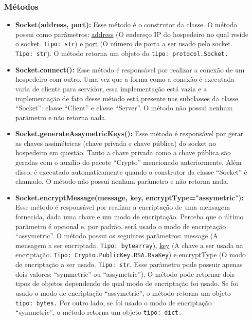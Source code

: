 \documentclass[10pt]{article}
\begin{document}
\begin{itemize}
        \subsubsection{\large Métodos}
            \begin{itemize}
            \item \textbf{Socket(address, port):} Esse método é o construtor da classe. O método possui como parâmetros: \underline{address} (O endereço IP do hospedeiro no qual reside o socket. \texttt{Tipo: str}) e \underline{port} (O número de porta a ser usado pelo socket. \texttt{Tipo: str}). O método retorna um objeto do \texttt{tipo: protocol.Socket.}
            \item \textbf{Socket.connect():} Esse método é responsável por realizar a conexão de um hospedeiro
            com outro. Uma vez que a forma como a conexão é executada varia de cliente para servidor, essa implementação está vazia e a implementação de fato desse método está presente nas subclasses da classe “Socket”: classe “Client” e classe “Server”. O método não possui nenhum parâmetro e não retorna nada.
            \item \textbf{Socket.generateAssymetricKeys():} Esse método é responsável por gerar as chaves assimétricas (chave privada e chave pública) do socket no hospedeiro em questão. Tanto a chave privada como a chave pública são geradas com o auxílio do pacote “Crypto” mencionado anteriormente. Além disso, é executado automaticamente quando o construtor da classe “Socket” é chamado. O método não possui nenhum parâmetro e não retorna nada.
            \item \textbf{Socket.encryptMessage(message, key, encryptType="assymetric"):} Esse \newline método é responsável por realizar a encriptação de uma mensagem fornecida, dada uma chave e um modo de encriptação. Perceba que o último parâmetro é opcional e, por padrão, será usado o modo de encriptação “assymetric”. O método possui os seguintes parâmetros: \underline{message} (A mensagem a ser encriptada. \texttt{Tipo: bytearray}), \underline{key} (A chave a ser usada na encriptação. \texttt{Tipo: Crypto.PublicKey.RSA.RsaKey}) e \underline{encryptType} (O modo de encriptação a ser usado. \texttt{Tipo: str}. Esse parâmetro pode possuir apenas dois valores: “symmetric” ou “assymetric”). O método pode retornar dois tipos de objetos dependendo de qual modo de encriptação foi usado. Se foi usado o modo de encriptação “assymetric”, o método retorna um objeto \texttt{tipo: bytes.} Por outro lado, se foi usado o modo de encriptação “symmetric”, o método retorna um objeto \texttt{tipo: dict.}

\end{itemize}
\end{itemize}
\end{document}
